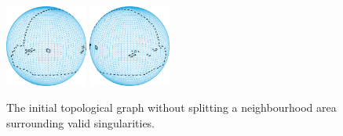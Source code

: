 \documentclass[Afour,sageh,times]{sagej}
\begin{document}
\begin{figure}[t]
\centering
\includegraphics[width = 0.24\textwidth]{figures/real_world/whole_graph_left}
\includegraphics[width = 0.24\textwidth]{figures/real_world/whole_graph_right}
\caption{The initial topological graph without splitting a neighbourhood area surrounding valid singularities. }\label{fig:whole_graph}
\end{figure}
\end{document}
